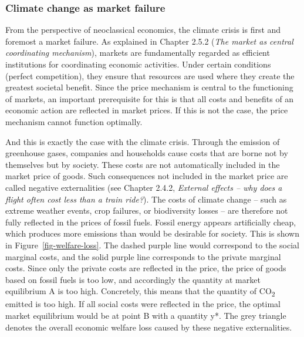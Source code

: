 \documentclass[
  british,
  a4paper,
  DIV=11,
  numbers=noendperiod,
  oneside,
  openany]{scrreprt}
\begin{document}
\subsubsection{Climate change as market
failure}\label{climate-change-as-market-failure}

From the perspective of neoclassical economics, the climate crisis is
first and foremost a market failure. As explained in Chapter 2.5.2
(\emph{The market as central coordinating mechanism}), markets are
fundamentally regarded as efficient institutions for coordinating
economic activities. Under certain conditions (perfect competition),
they ensure that resources are used where they create the greatest
societal benefit. Since the price mechanism is central to the
functioning of markets, an important prerequisite for this is that all
costs and benefits of an economic action are reflected in market prices.
If this is not the case, the price mechanism cannot function optimally.

And this is exactly the case with the climate crisis. Through the
emission of greenhouse gases, companies and households cause costs that
are borne not by themselves but by society. These costs are not
automatically included in the market price of goods. Such consequences
not included in the market price are called negative externalities (see
Chapter 2.4.2, \emph{External effects -- why does a flight often cost
less than a train ride?}). The costs of climate change -- such as
extreme weather events, crop failures, or biodiversity losses -- are
therefore not fully reflected in the prices of fossil fuels. Fossil
energy appears artificially cheap, which produces more emissions than
would be desirable for society. This is shown in
Figure~\ref{fig-welfare-loss}. The dashed purple line would correspond
to the social marginal costs, and the solid purple line corresponds to
the private marginal costs. Since only the private costs are reflected
in the price, the price of goods based on fossil fuels is too low, and
accordingly the quantity at market equilibrium A is too high.
Concretely, this means that the quantity of CO\textsubscript{2} emitted
is too high. If all social costs were reflected in the price, the
optimal market equilibrium would be at point B with a quantity y*. The
grey triangle denotes the overall economic welfare loss caused by these
negative externalities.
\end{document}
